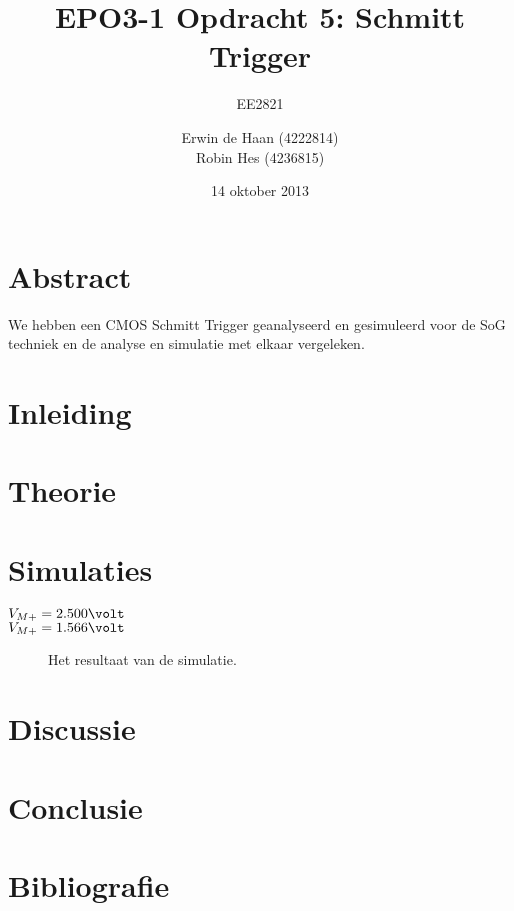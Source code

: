 \documentclass{scrartcl}  %
\author{Erwin {de Haan} (4222814)  \\{Robin Hes} (4236815)}
\title{EPO3-1 Opdracht 5: Schmitt Trigger}
\subtitle{EE2821}
\date{14 oktober 2013}
\begin{document}
\maketitle
\vspace{80 mm}
\section*{Abstract}
We hebben een CMOS Schmitt Trigger geanalyseerd en gesimuleerd voor de SoG techniek en de analyse en simulatie met elkaar vergeleken.
\newpage
\setlength{\cftbeforetoctitleskip}{-3em}
\tableofcontents
\newpage
{}
\section{Inleiding}

\section{Theorie}
\section{Simulaties}
$V_{M+} = 2.500 \volt$\\
$V_{M+} = 1.566 \volt$
\begin{figure}[H]
\centering
	\setlength{} 
	\setlength{}
	
	\caption{Het resultaat van de simulatie.}
	\label{fig:st}
\end{figure}

\section{Discussie}

\section{Conclusie}

\newpage
{}
\section{Bibliografie}
\printbibliography
\end{document}
